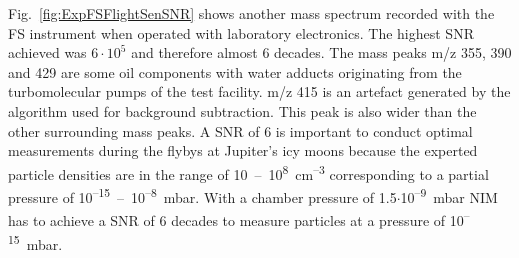 		Fig.~\ref{fig:ExpFSFlightSenSNR} shows another mass spectrum recorded with the FS instrument when operated with laboratory electronics. The highest SNR achieved was $6\cdot10^{5}$ and therefore almost 6 decades. The mass peaks m/z 355, 390 and 429 are some oil components with water adducts originating from the turbomolecular pumps of the test facility. m/z 415 is an artefact generated by the algorithm used for background subtraction. This peak is also wider than the other surrounding mass peaks. A SNR of 6 is important to conduct optimal measurements during the flybys at Jupiter's icy moons because the experted particle densities are in the range of 10~--~10\textsuperscript{8}~cm\textsuperscript{--3} \cite{Vorburger2015, Vorburger_2018} corresponding to a partial pressure of 10\textsuperscript{--15}~--~10\textsuperscript{--8}~mbar. With a chamber pressure of 1.5$\cdot$10\textsuperscript{--9}~mbar NIM has to achieve a SNR of 6 decades to measure particles at a pressure of 10\textsuperscript{--15}~mbar.\\
		
